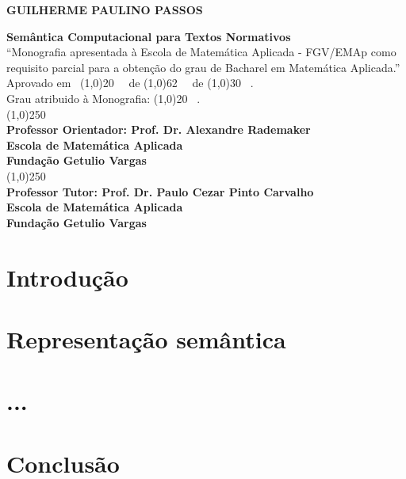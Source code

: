 \documentclass[12pt, a4paper, twoside]{article}
\newcommand{\supervisor}{Alexandre Rademaker}
\begin{document}
\begin{titlepage}
 \begin{center}
 
  {\bf \large \uppercase{Guilherme Paulino Passos}}\\[0.3cm]

  \vspace{25 mm}

  {\bf \large Semântica Computacional para Textos Normativos}\\[3cm]

  {“Monografia apresentada à Escola de Matemática Aplicada  - FGV/EMAp como requisito parcial para a obtenção do grau de Bacharel em Matemática Aplicada.”}\\[3cm]


  {Aprovado em \ \line(1,0){20} \ \ de \line(1,0){62} \ \ de \line(1,0){30} \ .}\\[0.1cm]
  {Grau atribuido à Monografia: \line(1,0){20} \ . }\\[3cm]
  
  
  {\line(1,0){250}}\\
  {\bf Professor Orientador: Prof. Dr. \supervisor}\\[0.1cm]
  {\bf Escola de Matemática Aplicada}\\[0.1cm]
  {\bf Fundação Getulio Vargas}\\[1.5cm]
  
    {\line(1,0){250}}\\
    {\bf Professor Tutor: Prof. Dr. Paulo Cezar Pinto Carvalho}\\[0.1cm]
    {\bf Escola de Matemática Aplicada}\\[0.1cm]
    {\bf Fundação Getulio Vargas}
 \end{center}
\end{titlepage}

\newpage\null\thispagestyle{empty}\newpage


\tableofcontents

\newpage

\section{Introdução}
\newpage
\section{Representação semântica}
\label{sec:rep}


\newpage
\section{...}

\newpage
\section{Conclusão}


\newpage


\end{document}
